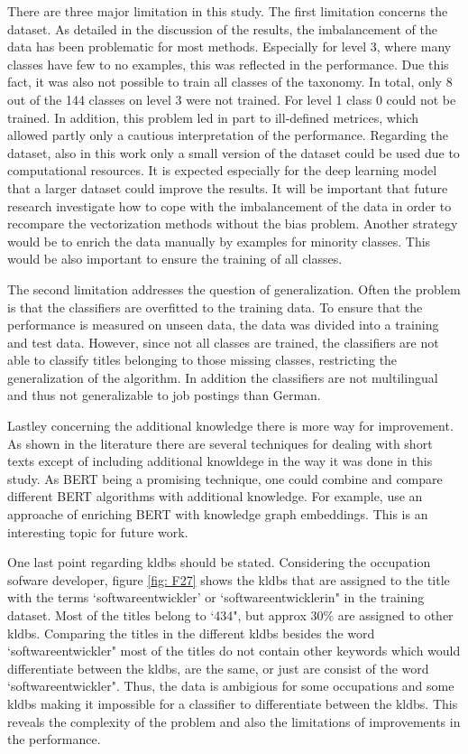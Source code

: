 \documentclass[12pt, a4paper, titlepage]{article}
\begin{document}
There are three major limitation in this study. The first limitation concerns the dataset. As detailed in the discussion of the results, the imbalancement of the data has been problematic for most methods. Especially for level 3, where many classes have few to no examples, this was reflected in the performance. Due this fact, it was also not possible to train all classes of the taxonomy. In total, only 8 out of the 144 classes on level 3 were not trained. For level 1 class 0 could not be trained. In addition, this problem led in part to ill-defined metrices, which allowed partly only a cautious interpretation of the performance. Regarding the dataset, also in this work only a small version of the dataset could be used due to computational resources. It is expected especially for the deep learning model that a larger dataset could improve the results. It will be important that future research investigate how to cope with the imbalancement of the data in order to recompare the vectorization methods without the bias problem. Another strategy would be to enrich the data manually by examples for minority classes. This would be also important to ensure the training of all classes.  

The second limitation addresses the question of generalization. Often the problem is that the classifiers are overfitted to the training data. To ensure that the performance is measured on unseen data, the data was divided into a training and test data. However, since not all classes are trained, the classifiers are not able to classify titles belonging to those missing classes, restricting the generalization of the algorithm. In addition the classifiers are not multilingual and thus not generalizable to job postings than German.  

Lastley concerning the additional knowledge there is more way for improvement. As shown in the literature there are several techniques for dealing with short texts except of including additional knowldege in the way it was done in this study. As \ac{BERT} being a promising technique, one could combine and compare different \ac{BERT} algorithms with additional knowledge. For example, \citet{ostendorff2019} use an approache of enriching \ac{BERT} with knowledge graph embeddings. This is an interesting topic for future work. 

One last point regarding kldbs should be stated. Considering the occupation sofware developer, figure \ref{fig: F27} shows the kldbs that are assigned to the title with the terms `softwareentwickler' or `softwareentwicklerin" in the training dataset. Most of the titles belong to `434", but approx $30\%$ are assigned to other kldbs. Comparing the titles in the different kldbs besides the word `softwareentwickler" most of the titles do not contain other keywords  which would differentiate between the kldbs, are the same, or just are consist of the word `softwareentwickler". Thus, the data is ambigious for some occupations and some kldbs making it impossible for a classifier to differentiate between the kldbs. This reveals the complexity of the problem and also the limitations of improvements in the performance. 
\end{document}
